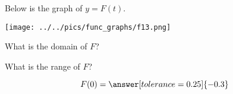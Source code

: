 \documentclass{ximera}
\author{Lee Wayand}
\begin{document}
\begin{exercise}  





Below is the graph of $y=F(t)$.  

\begin{image}
\texttt{[image: ../../pics/func\_graphs/f13.png]}
\end{image}









\begin{question} 


What is the domain of $F$?\\


\begin{multipleChoice}
\choice {$(-\infty, \infty)$}
\choice {$[-9.9]$}
\end{multipleChoice}

\end{question}






\begin{question} 


What is the range of $F$?\\


\begin{multipleChoice}
\choice {$(-\infty, \infty)$}
\choice {$[-10.10]$}
\end{multipleChoice}


\end{question}









\begin{question} 



\[  F(0) = \answer[tolerance=0.25]{-0.3}  \]

\end{question}







\begin{question} 



\end{question}
\end{exercise}
\end{document}
